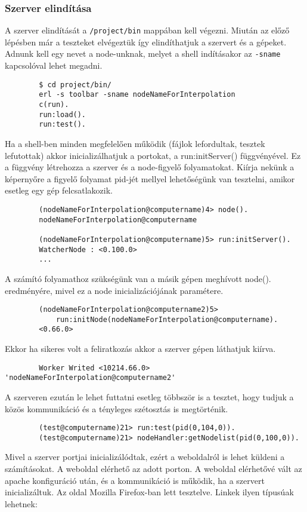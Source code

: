 \subsubsection{Szerver elindítása}
	A szerver elindítását a \texttt{/project/bin} mappában kell végezni. Miután az előző lépésben már a teszteket elvégeztük így elindíthatjuk a szervert és a gépeket.
	Adnunk kell egy nevet a node-unknak, melyet a shell indításakor az \texttt{-sname} kapcsolóval lehet megadni.
	\begin{verbatim}
		$ cd project/bin/
		erl -s toolbar -sname nodeNameForInterpolation
		c(run).
		run:load().
		run:test().
	\end{verbatim}
	Ha a shell-ben minden megfelelően működik (fájlok lefordultak, tesztek lefutottak) akkor inicializálhatjuk a portokat, a run:initServer() függvényével. Ez a függvény létrehozza a szerver és a node-figyelő folyamatokat. Kiírja nekünk a képernyőre a figyelő folyamat pid-jét mellyel lehetőségünk van tesztelni, amikor esetleg egy gép felcsatlakozik. 
	\begin{verbatim}
		(nodeNameForInterpolation@computername)4> node().
		nodeNameForInterpolation@computername

		(nodeNameForInterpolation@computername)5> run:initServer().
		WatcherNode : <0.100.0>
		...
	\end{verbatim}
	A számító folyamathoz szükségünk van a másik gépen meghívott node(). eredményére, mivel ez a node inicializációjának paramétere. 
	\begin{verbatim}
		(nodeNameForInterpolation@computername2)5> 
		    run:initNode(nodeNameForInterpolation@computername).
		<0.66.0>
	\end{verbatim}
	Ekkor ha sikeres volt a feliratkozás akkor a szerver gépen láthatjuk kiírva.
	\begin{verbatim}
		Worker Writed <10214.66.0> 'nodeNameForInterpolation@computername2'
	\end{verbatim}
	A szerveren ezután le lehet futtatni esetleg többször is a tesztet, hogy tudjuk a közös kommunikáció és a tényleges szétosztás is megtörténik.
	\begin{verbatim}
		(test@computername)21> run:test(pid(0,104,0)).
		(test@computername)21> nodeHandler:getNodelist(pid(0,100,0)).
	\end{verbatim}
	Mivel a szerver portjai inicializálódtak, ezért a weboldalról is lehet küldeni a számításokat. 
	A weboldal elérhető az adott porton. A weboldal elérhetővé vált az apache konfiguráció után, és a kommunikáció is működik, ha a szervert inicializáltuk. Az oldal Mozilla Firefox-ban lett tesztelve. Linkek ilyen típusúak lehetnek: 
